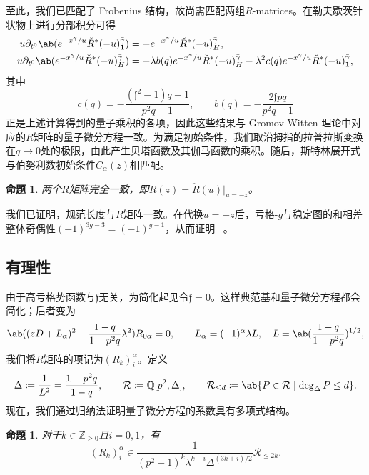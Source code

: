 \documentclass{amsart}
\newtheorem{prop}[thm]{命题}
\theoremstyle{definition}
\theoremstyle{remark}
\theoremstyle{plain}
\theoremstyle{definition}
\theoremstyle{remark}
\newcommand{\Z}{\mathbb{Z}}
\newcommand{\Q}{\mathbb{Q}}
\newcommand{\mc}[1]{\mathcal{#1}}
\newcommand{\mf}[1]{\mathfrak{#1}}
\newcommand{\1}{\mathbf{1}}
\newcommand{\2}{\mathbf{2}}
\newcommand{\3}{\mathbf{3}}
\begin{document}
至此，我们已匹配了 Frobenius 结构，故尚需匹配两组\(R\)-matrices。在勒夫歇茨针状物上进行分部积分可得
\begin{align*}
    u \partial_{t^0}\ab(e^{-x^{\gamma}/u}\check{R}^*(-u)^{\bar{\gamma}}_{\1}) &= -e^{-x^{\gamma}/u}\check{R}^*(-u)^{\bar{\gamma}}_H, \\
    u\partial_{t^0}\ab(e^{-x^{\gamma}/u}\check{R}^*(-u)^{\bar{\gamma}}_H) &= -\lambda b(q)e^{-x^{\gamma}/u}\check{R}^*(-u)^{\bar{\gamma}}_H - \lambda^2 c(q) e^{-x^{\gamma}/u}\check{R}^*(-u)^{\bar{\gamma}}_{\1},
\end{align*}
其中
\[ c(q) = -\frac{(\mf{f}^2-1)q+1}{p^2q-1}, \qquad b(q) = -\frac{2\mf{f}pq}{p^2q-1} \]
正是上述计算得到的量子乘积的各项，因此这些结果与 Gromov-Witten 理论中对应的\(R\)矩阵的量子微分方程一致。为满足初始条件，我们取沿拇指的拉普拉斯变换在\(q \to 0\)处的极限，由此产生贝塔函数及其伽马函数的乘积。随后，斯特林展开式与伯努利数初始条件\(C_{\alpha}(z)\)相匹配。

\begin{prop}%
\label{prop:R matrices coincide}
两个\(R\)矩阵完全一致，即\(R(z) = \check{R}(u)|_{u=-z}\)。
\end{prop}

我们已证明，规范长度与\(R\)矩阵一致。在代换\(u = -z\)后，亏格-\(g\)与稳定图的和相差整体奇偶性\((-1)^{3g-3} = (-1)^{g-1}\)，从而证明 ~。

\subsection{有理性}%
\label{sub:Rationality}

由于高亏格势函数与\(\mf{f}\)无关，为简化起见令\(\mf{f} = 0\)。这样典范基和量子微分方程都会简化；后者变为
\[ \ab((zD+L_{\alpha})^2 - \frac{1-q}{1-p^2q}\lambda^2)R_{0\bar{\alpha}} = 0, \qquad L_{\alpha} = (-1)^{\alpha}\lambda L, \quad L = \ab(\frac{1-q}{1-p^2q})^{1/2}, \]
我们将\(R\)矩阵的项记为\((R_k)_i^{\alpha}\)。定义
\[ \Delta \coloneqq \frac{1}{L^2} = \frac{1-p^2q}{1-q}, \qquad \mc{R} \coloneqq \Q[p^2,\Delta], \qquad \mc{R}_{\leq d} \coloneqq \ab\{P \in \mc{R} \mid \deg_{\Delta} P \leq d\}. \]
现在，我们通过归纳法证明量子微分方程的系数具有多项式结构。

\begin{prop}%
\label{prop:R matrix polynomiality}
对于\(k \in \Z_{\geq0}\)且\(i = 0,1\)，有
    \[ (R_k)_i^{\alpha} \in \frac{1}{(p^2-1)^k \lambda^{k-i}\Delta^{(3k+i)/2}}\mc{R}_{\leq 2k}. \]
\end{prop}
\end{document}
